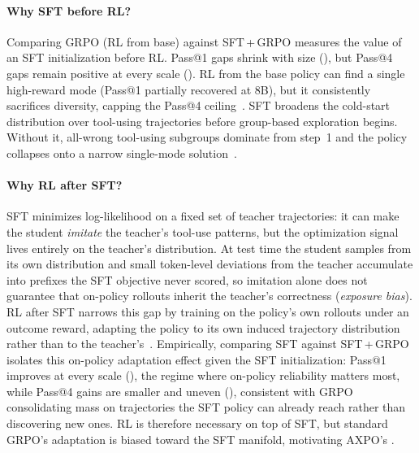 \paragraph{Why SFT before RL?}
Comparing GRPO (RL from base) against SFT\,+\,GRPO measures the value of an SFT initialization before RL. Pass@1 gaps shrink with size (\dSFTinitPassOne), but Pass@4 gaps remain positive at every scale (\dSFTinitPassFour). RL from the base policy can find a single high-reward mode (Pass@1 partially recovered at 8B), but it consistently sacrifices diversity, capping the Pass@4 ceiling~\citep{rlvr}.
SFT broadens the cold-start distribution over tool-using trajectories before group-based exploration begins. Without it, all-wrong tool-using subgroups dominate from step~1 and the policy collapses onto a narrow single-mode solution~\citep{deepeyesv2}.

\paragraph{Why RL after SFT?}
SFT minimizes log-likelihood on a fixed set of teacher trajectories: it can make the student \emph{imitate} the teacher's tool-use patterns, but the optimization signal lives entirely on the teacher's distribution. At test time the student samples from its own distribution and small token-level deviations from the teacher accumulate into prefixes the SFT objective never scored, so imitation alone does not guarantee that on-policy rollouts inherit the teacher's correctness (\emph{exposure bias}).
RL after SFT narrows this gap by training on the policy's own rollouts under an outcome reward, adapting the policy to its own induced trajectory distribution rather than to the teacher's~\citep{rlgeneralize}.
Empirically, comparing SFT against SFT\,+\,GRPO isolates this on-policy adaptation effect given the SFT initialization: Pass@1 improves at every scale (\dRLAfterSFTPassOne), the regime where on-policy reliability matters most, while Pass@4 gains are smaller and uneven (\dRLAfterSFTPassFour), consistent with GRPO consolidating mass on trajectories the SFT policy can already reach rather than discovering new ones. RL is therefore necessary on top of SFT, but standard GRPO's adaptation is biased toward the SFT manifold, motivating AXPO's \toolresample.

